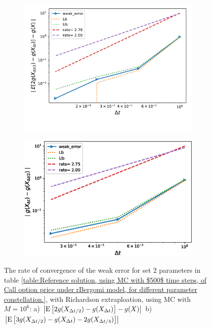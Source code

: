 \documentclass[11pt]{article}
\newcommand{\expt}[1]{\mathrm{E}\left[#1\right]}
\begin{document}
\begin{figure}[h!]
	\centering
	\begin{subfigure}{.4\textwidth}
		\centering
		\includegraphics[width=1\linewidth]{./figures/rBergomi_weak_error_rates/with_richardson/H_007/weak_convergence_order_Bergomi_H_007_K_1_richardson_relative_M_10_6}
		\caption{}
		\label{fig:sub3}
	\end{subfigure}%
	\begin{subfigure}{.4\textwidth}
		\centering
		\includegraphics[width=1\linewidth]{./figures/rBergomi_weak_error_rates/with_richardson/H_007/weak_convergence_order_differences_Bergomi_H_007_K_1_richardson_relative_M_10_6}
		\caption{}
		\label{fig:sub4}
	\end{subfigure}
	
	\caption{The rate of convergence of the weak error for set $2$ parameters in table \ref{table:Reference solution, using MC with $500$ time steps, of Call option price under rBergomi model, for different parameter constellation.}, with Richardson extraploation, using MC with $M=10^6$: a) $\abs{\expt{2 g(X_{\Delta t/2}) -g(X_{\Delta t})}-g(X)}$  b) $\abs{\expt{3 g(X_{\Delta t/2})-g(X_{\Delta t})-2 g(X_{\Delta t/4})}}$ }
	\label{fig:Weak_rate_H_007_with_rich}
\end{figure}
\end{document}
